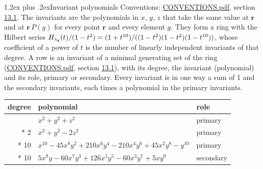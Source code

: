 \documentclass[10pt,a4paper]{article}
\makeatletter
\renewcommand\section{\@startsection{section}{1}{\z@}{-3ex plus -1ex minus -.2ex}%
  {1.2ex plus .2ex}{\normalfont\large\sffamily\bfseries\color{parttitle}}}
\numberwithin{equation}{section}
\newcommand{\irr}[1]{\text{\normalfont\scshape #1}}
\newcommand{\ptag}[1]{\mathrm{#1}}
\newcommand{\pointr}{\mathbf{r}}
\makeatother
\begin{document}
\section{Invariant polynomials}\label{s:invariant_polynomials}
Conventions: \href{../../CONVENTIONS.pdf}{CONVENTIONS.pdf}, section \href{../../CONVENTIONS.pdf\#conv.13.1}{13.1}.
The invariants are the polynomials in $x$, $y$, $z$ that take the same value at $\pointr$ and at $\pointr\,P(g)$ for every point $\pointr$ and every element $g$. They form a ring with the Hilbert series $H_{\irr{a}_{\ptag{g}}}(t)/(1-t^{2}) = (1 + t^{10})/((1-t^{2})(1-t^{2})(1-t^{10}))$, whose coefficient of a power of $t$ is the number of linearly independent invariants of that degree. \label{n:head.degree}\label{n:head.role}A row is an invariant of a minimal generating set of the ring (\href{../../CONVENTIONS.pdf}{CONVENTIONS.pdf}, section \href{../../CONVENTIONS.pdf\#conv.13.1}{13.1}), with its degree, the invariant (polynomial) and its role, primary or secondary. Every invariant is in one way a sum of 1 and the secondary invariants, each times a polynomial in the primary invariants.
{\small\begin{longtable}{@{}rll@{}}\toprule
degree & polynomial & role\\\midrule\endhead
\bottomrule\endfoot\endlastfoot
2 & $x^{2} + y^{2} + z^{2}$ & primary\\*
2 & $x^{2} + y^{2} - 2z^{2}$ & primary\\*
10 & $x^{10} - 45x^{8}y^{2} + 210x^{6}y^{4} - 210x^{4}y^{6} + 45x^{2}y^{8} - y^{10}$ & primary\\*
10 & $5x^{9}y - 60x^{7}y^{3} + 126x^{5}y^{5} - 60x^{3}y^{7} + 5xy^{9}$ & secondary\\
\bottomrule\end{longtable}}
\end{document}

